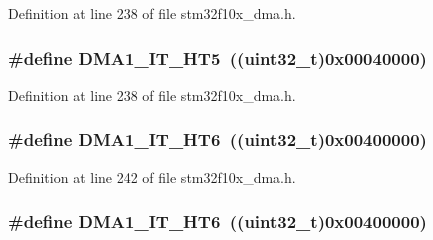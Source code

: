 Definition at line 238 of file stm32f10x\+\_\+dma.\+h.

\subsubsection[{\texorpdfstring{D\+M\+A1\+\_\+\+I\+T\+\_\+\+H\+T5}{DMA1_IT_HT5}}]{\setlength{\rightskip}{0pt plus 5cm}\#define D\+M\+A1\+\_\+\+I\+T\+\_\+\+H\+T5~(({\bf uint32\+\_\+t})0x00040000)}\hypertarget{group___d_m_a__interrupts__definition_ga3ddcb696d05b414be7a533993efa849f}{}\label{group___d_m_a__interrupts__definition_ga3ddcb696d05b414be7a533993efa849f}


Definition at line 238 of file stm32f10x\+\_\+dma.\+h.

\subsubsection[{\texorpdfstring{D\+M\+A1\+\_\+\+I\+T\+\_\+\+H\+T6}{DMA1_IT_HT6}}]{\setlength{\rightskip}{0pt plus 5cm}\#define D\+M\+A1\+\_\+\+I\+T\+\_\+\+H\+T6~(({\bf uint32\+\_\+t})0x00400000)}\hypertarget{group___d_m_a__interrupts__definition_ga0a86890a8aa84b5c4f12f1684850fa91}{}\label{group___d_m_a__interrupts__definition_ga0a86890a8aa84b5c4f12f1684850fa91}


Definition at line 242 of file stm32f10x\+\_\+dma.\+h.

\subsubsection[{\texorpdfstring{D\+M\+A1\+\_\+\+I\+T\+\_\+\+H\+T6}{DMA1_IT_HT6}}]{\setlength{\rightskip}{0pt plus 5cm}\#define D\+M\+A1\+\_\+\+I\+T\+\_\+\+H\+T6~(({\bf uint32\+\_\+t})0x00400000)}\hypertarget{group___d_m_a__interrupts__definition_ga0a86890a8aa84b5c4f12f1684850fa91}{}\label{group___d_m_a__interrupts__definition_ga0a86890a8aa84b5c4f12f1684850fa91}


